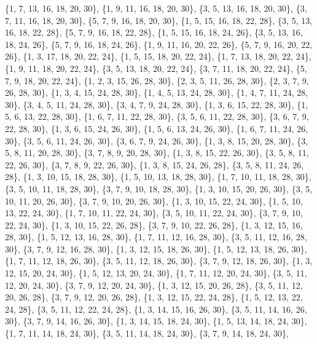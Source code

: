 \documentclass[11pt,a4paper]{article}
\begin{document}
{\{1, 7, 13, 16, 18, 20, 30\}, \{1, 9, 11, 16, 18, 20, 30\}, \{3, 5, 13, 16, 18, 20, 30\}, \{3, 7, 11, 16, 18, 20, 30\}, \{5, 7, 9, 16, 18, 20, 30\},
\{1, 5, 15, 16, 18, 22, 28\}, \{3, 5, 13, 16, 18, 22, 28\}, \{5, 7, 9, 16, 18, 22, 28\}, \{1, 5, 15, 16, 18, 24, 26\}, \{3, 5, 13, 16, 18, 24, 26\},
\{5, 7, 9, 16, 18, 24, 26\}, \{1, 9, 11, 16, 20, 22, 26\}, \{5, 7, 9, 16, 20, 22, 26\}, \{1, 3, 17, 18, 20, 22, 24\}, \{1, 5, 15, 18, 20, 22, 24\},
\{1, 7, 13, 18, 20, 22, 24\}, \{1, 9, 11, 18, 20, 22, 24\}, \{3, 5, 13, 18, 20, 22, 24\}, \{3, 7, 11, 18, 20, 22, 24\}, \{5, 7, 9, 18, 20, 22, 24\},
\{1, 2, 3, 15, 26, 28, 30\}, \{2, 3, 5, 11, 26, 28, 30\}, \{2, 3, 7, 9, 26, 28, 30\}, \{1, 3, 4, 15, 24, 28, 30\}, \{1, 4, 5, 13, 24, 28, 30\},
\{1, 4, 7, 11, 24, 28, 30\}, \{3, 4, 5, 11, 24, 28, 30\}, \{3, 4, 7, 9, 24, 28, 30\}, \{1, 3, 6, 15, 22, 28, 30\}, \{1, 5, 6, 13, 22, 28, 30\},
\{1, 6, 7, 11, 22, 28, 30\}, \{3, 5, 6, 11, 22, 28, 30\}, \{3, 6, 7, 9, 22, 28, 30\}, \{1, 3, 6, 15, 24, 26, 30\}, \{1, 5, 6, 13, 24, 26, 30\},
\{1, 6, 7, 11, 24, 26, 30\}, \{3, 5, 6, 11, 24, 26, 30\}, \{3, 6, 7, 9, 24, 26, 30\}, \{1, 3, 8, 15, 20, 28, 30\}, \{3, 5, 8, 11, 20, 28, 30\},
\{3, 7, 8, 9, 20, 28, 30\}, \{1, 3, 8, 15, 22, 26, 30\}, \{3, 5, 8, 11, 22, 26, 30\}, \{3, 7, 8, 9, 22, 26, 30\}, \{1, 3, 8, 15, 24, 26, 28\},
\{3, 5, 8, 11, 24, 26, 28\}, \{1, 3, 10, 15, 18, 28, 30\}, \{1, 5, 10, 13, 18, 28, 30\}, \{1, 7, 10, 11, 18, 28, 30\}, \{3, 5, 10, 11, 18, 28, 30\},
\{3, 7, 9, 10, 18, 28, 30\}, \{1, 3, 10, 15, 20, 26, 30\}, \{3, 5, 10, 11, 20, 26, 30\}, \{3, 7, 9, 10, 20, 26, 30\}, \{1, 3, 10, 15, 22, 24, 30\},
\{1, 5, 10, 13, 22, 24, 30\}, \{1, 7, 10, 11, 22, 24, 30\}, \{3, 5, 10, 11, 22, 24, 30\}, \{3, 7, 9, 10, 22, 24, 30\}, \{1, 3, 10, 15, 22, 26, 28\},
\{3, 7, 9, 10, 22, 26, 28\}, \{1, 3, 12, 15, 16, 28, 30\}, \{1, 5, 12, 13, 16, 28, 30\}, \{1, 7, 11, 12, 16, 28, 30\}, \{3, 5, 11, 12, 16, 28, 30\},
\{3, 7, 9, 12, 16, 28, 30\}, \{1, 3, 12, 15, 18, 26, 30\}, \{1, 5, 12, 13, 18, 26, 30\}, \{1, 7, 11, 12, 18, 26, 30\}, \{3, 5, 11, 12, 18, 26, 30\},
\{3, 7, 9, 12, 18, 26, 30\}, \{1, 3, 12, 15, 20, 24, 30\}, \{1, 5, 12, 13, 20, 24, 30\}, \{1, 7, 11, 12, 20, 24, 30\}, \{3, 5, 11, 12, 20, 24, 30\},
\{3, 7, 9, 12, 20, 24, 30\}, \{1, 3, 12, 15, 20, 26, 28\}, \{3, 5, 11, 12, 20, 26, 28\}, \{3, 7, 9, 12, 20, 26, 28\}, \{1, 3, 12, 15, 22, 24, 28\},
\{1, 5, 12, 13, 22, 24, 28\}, \{3, 5, 11, 12, 22, 24, 28\}, \{1, 3, 14, 15, 16, 26, 30\}, \{3, 5, 11, 14, 16, 26, 30\}, \{3, 7, 9, 14, 16, 26, 30\},
\{1, 3, 14, 15, 18, 24, 30\}, \{1, 5, 13, 14, 18, 24, 30\}, \{1, 7, 11, 14, 18, 24, 30\}, \{3, 5, 11, 14, 18, 24, 30\}, \{3, 7, 9, 14, 18, 24, 30\},
}
\end{document}
